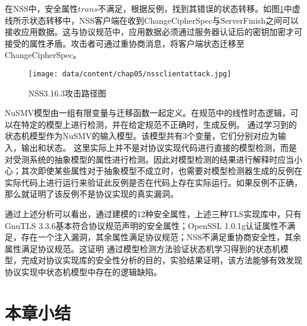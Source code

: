 在NSS中，安全属性$trans$不满足，根据反例，找到其错误的状态转移。如图\ref{fig-nssclientattack}中虚线所示状态转移中，NSS客户端在收到ChangeCipherSpec与ServerFinish之间可以接收应用数据。这与协议规范中，应用数据必须通过服务器认证后的密钥加密才可接受的属性矛盾。攻击者可通过重协商消息，将客户端状态迁移至ChangeCipherSpec。

\begin{figure}[htp]
	\centering
	\texttt{[image: data/content/chap05/nssclientattack.jpg]}
	\caption{NSS3.16.3攻击路径图}
	\label{fig-nssclientattack}
\end{figure}


NuSMV模型由一组有限变量与迁移函数一起定义。在规范中的线性时态逻辑，可以在特定的模型上进行检测，并在给定规范不正确时，生成反例。
通过学习到的状态机模型作为NuSMV的输入模型。该模型共有3个变量，它们分别对应为输入，输出和状态。
这里实际上并不是对协议实现代码进行直接的模型检测，而是对受测系统的抽象模型的属性进行检测。因此对模型检测的结果进行解释时应当小心；其次即使某些属性对于抽象模型不成立时，也需要对模型检测器生成的反例在实际代码上进行运行来验证此反例是否在代码上存在实际运行。如果反例不正确，那么就证明了该反例不是协议实现的真实漏洞。

通过上述分析可以看出，通过建模的12种安全属性，上述三种TLS实现库中，只有GnuTLS 3.3.6基本符合协议规范声明的安全属性；OpenSSL 1.0.1g认证属性不满足，存在一个注入漏洞，其余属性满足协议规范；NSS不满足重协商安全性，其余属性满足协议规范。这证明
通过模型检测方法验证状态机学习得到的状态机模型，完成对协议实现库的安全性分析的目的，实验结果证明，该方法能够有效发现协议实现中状态机模型中存在的逻辑缺陷。



\section{本章小结}



